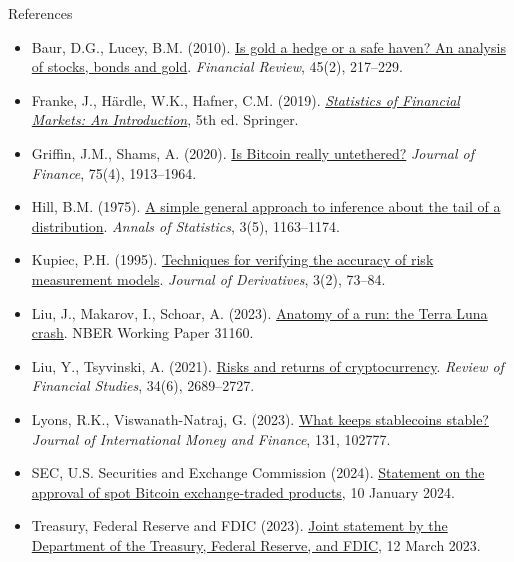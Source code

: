 \begin{frame}{References}
\itemsize{\tiny}
\begin{itemize}
    \item Baur, D.G., Lucey, B.M. (2010). \href{https://doi.org/10.1111/j.1540-6288.2010.00244.x}{Is gold a hedge or a safe haven? An analysis of stocks, bonds and gold}. \textit{Financial Review}, 45(2), 217--229.
    \item Franke, J., Härdle, W.K., Hafner, C.M. (2019). \href{https://doi.org/10.1007/978-3-030-13751-9}{\textit{Statistics of Financial Markets: An Introduction}}, 5th ed. Springer.
    \item Griffin, J.M., Shams, A. (2020). \href{https://doi.org/10.1111/jofi.12903}{Is Bitcoin really untethered?} \textit{Journal of Finance}, 75(4), 1913--1964.
    \item Hill, B.M. (1975). \href{https://doi.org/10.1214/aos/1176343247}{A simple general approach to inference about the tail of a distribution}. \textit{Annals of Statistics}, 3(5), 1163--1174.
    \item Kupiec, P.H. (1995). \href{https://doi.org/10.3905/jod.1995.407942}{Techniques for verifying the accuracy of risk measurement models}. \textit{Journal of Derivatives}, 3(2), 73--84.
    \item Liu, J., Makarov, I., Schoar, A. (2023). \href{https://doi.org/10.3386/w31160}{Anatomy of a run: the Terra Luna crash}. NBER Working Paper 31160.
    \item Liu, Y., Tsyvinski, A. (2021). \href{https://doi.org/10.1093/rfs/hhaa113}{Risks and returns of cryptocurrency}. \textit{Review of Financial Studies}, 34(6), 2689--2727.
    \item Lyons, R.K., Viswanath-Natraj, G. (2023). \href{https://doi.org/10.1016/j.jimonfin.2022.102777}{What keeps stablecoins stable?} \textit{Journal of International Money and Finance}, 131, 102777.
    \item SEC, U.S. Securities and Exchange Commission (2024). \href{https://www.sec.gov/newsroom/speeches-statements/gensler-statement-spot-bitcoin-011023}{Statement on the approval of spot Bitcoin exchange-traded products}, 10 January 2024.
    \item Treasury, Federal Reserve and FDIC (2023). \href{https://www.federalreserve.gov/newsevents/pressreleases/monetary20230312b.htm}{Joint statement by the Department of the Treasury, Federal Reserve, and FDIC}, 12 March 2023.
\end{itemize}
\end{frame}


